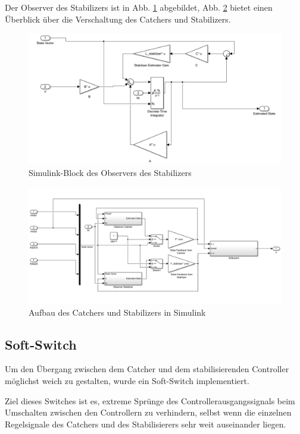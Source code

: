 Der Observer des Stabilizers ist in Abb. \ref{fig.obs_stabilizer} abgebildet, Abb. \ref{fig.top_equilibrium} bietet einen Überblick über die Verschaltung des Catchers und Stabilizers.

\begin{figure}[htbp]
	\centering	
	\label{fig.obs_stabilizer}
	\includegraphics[width=1\textwidth]{Grafiken/simulink_observer_stabilizer.png}
	\caption{Simulink-Block des Observers des Stabilizers}
\end{figure}

\begin{figure}[h!]
	\centering	
	\label{fig.top_equilibrium}
	\includegraphics[width=1\textwidth]{Grafiken/simulink_top_equilibrium.png}
	\caption{Aufbau des Catchers und Stabilizers in Simulink}
\end{figure}

\subsection{Soft-Switch}
\label{Softswitch}
Um den Übergang zwischen dem Catcher und dem stabilisierenden Controller möglichst weich zu gestalten, wurde ein Soft-Switch implementiert.

Ziel dieses Switches ist es, extreme Sprünge des Controllerausgangssignals beim Umschalten zwischen den Controllern zu verhindern, selbst wenn die einzelnen Regelsignale des Catchers und des Stabilisierers sehr weit auseinander liegen.

